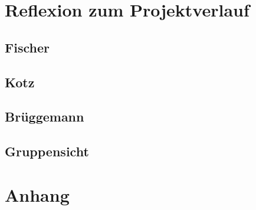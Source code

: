 \documentclass[11pt]{article}
\begin{document}
\section{Reflexion zum Projektverlauf}
\subsection{Fischer}
\subsection{Kotz}
\subsection{Brüggemann}
\subsection{Gruppensicht}
\section{Anhang}
\end{document}

